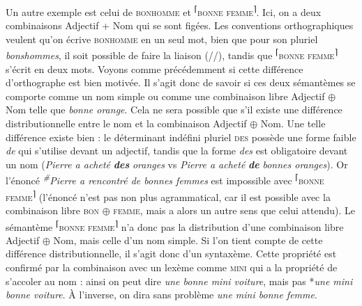 Un autre exemple est celui de \textsc{bonhomme} et \textsuperscript{⌈}\textsc{bonne} \textsc{femme}\textsuperscript{⌉}. Ici, on a deux combinaisons Adjectif + Nom qui se sont figées. Les conventions orthographiques veulent qu’on écrive \textsc{bonhomme} en un seul mot, bien que pour son pluriel \textit{bonshommes}, il soit possible de faire la liaison (//), tandis que \textsuperscript{⌈}\textsc{bonne} \textsc{femme}\textsuperscript{⌉} s’écrit en deux mots. Voyons comme précédemment si cette différence d’orthographe est bien motivée. Il s’agit donc de savoir si ces deux sémantèmes se comporte comme un nom simple ou comme une combinaison libre Adjectif ${\oplus}$ Nom telle que \textit{bonne orange}. Cela ne sera possible que s’il existe une différence distributionnelle entre le nom et la combinaison Adjectif ${\oplus}$ Nom. Une telle différence existe bien : le déterminant indéfini pluriel \textsc{des} possède une forme faible \textit{de} qui s’utilise devant un adjectif, tandis que la forme \textit{des} est obligatoire devant un nom (\textit{Pierre a acheté} \textbf{\textit{des}} \textit{oranges} vs \textit{Pierre a acheté} \textbf{\textit{de}} \textit{bonnes oranges}). Or l’énoncé \textit{\textsuperscript{\#}}\textit{Pierre a rencontré de bonnes femmes} est impossible avec \textsuperscript{⌈}\textsc{bonne} \textsc{femme}\textsuperscript{⌉} (l’énoncé n’est pas non plus agrammatical, car il est possible avec la combinaison libre \textsc{bon} ${\oplus}$ \textsc{femme}, mais a alors un autre sens que celui attendu). Le sémantème \textsuperscript{⌈}\textsc{bonne} \textsc{femme}\textsuperscript{⌉} n’a donc pas la distribution d’une combinaison libre Adjectif ${\oplus}$ Nom, mais celle d’un nom simple. Si l’on tient compte de cette différence distributionnelle, il s’agit donc d’un syntaxème. Cette propriété est confirmé par la combinaison avec un lexème comme \textsc{mini} qui a la propriété de s’accoler au nom : ainsi on peut dire \textit{une bonne mini voiture}, mais pas *\textit{une mini bonne voiture}. À l’inverse, on dira sans problème \textit{une mini bonne femme}.


